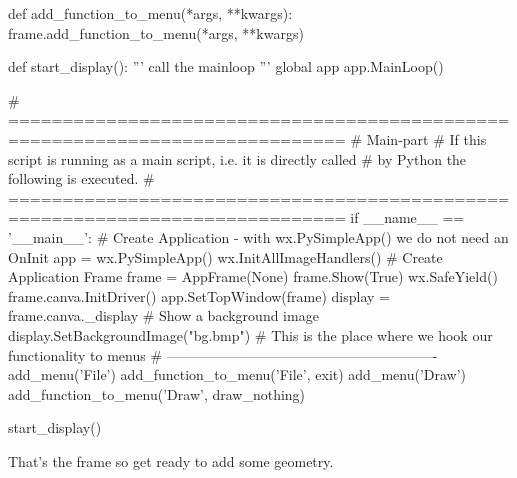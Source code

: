 \begin{python}[moreemph={[4], 46, 48},caption={Step1.py - The program frame},label=LISTING_STEP1_PY]
def add_function_to_menu(*args, **kwargs):
    frame.add_function_to_menu(*args, **kwargs)

def start_display():    
    '''
    call the mainloop
    '''
    global app
    app.MainLoop()
    
# =============================================================================
# Main-part
# If this script is running as a main script, i.e. it is directly called
# by Python the following is executed.
# =============================================================================
if __name__ == '__main__':
    # Create Application - with wx.PySimpleApp() we do not need an OnInit
    app = wx.PySimpleApp()
    wx.InitAllImageHandlers()
    # Create Application Frame
    frame = AppFrame(None)
    frame.Show(True)
    wx.SafeYield()
    frame.canva.InitDriver()
    app.SetTopWindow(frame)
    display = frame.canva._display
    # Show a background image
    display.SetBackgroundImage("bg.bmp")  
    # This is the place where we hook our functionality to menus
    # ----------------------------------------------------------
    add_menu('File')
    add_function_to_menu('File',  exit)
    add_menu('Draw')
    add_function_to_menu('Draw', draw_nothing)
    
    start_display()
\end{python}


That's the frame so get ready to add some geometry.
